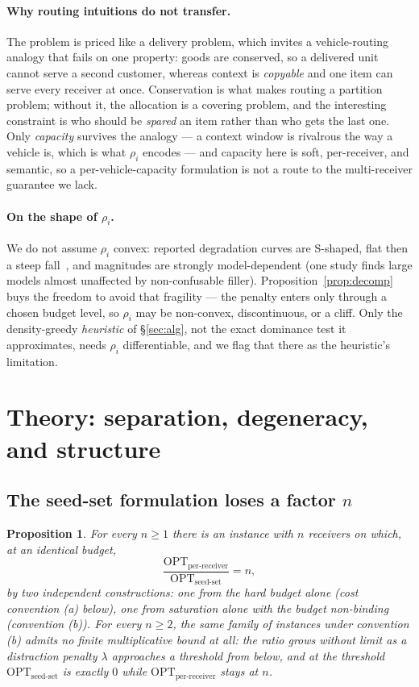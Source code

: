 \documentclass[sigconf,anonymous]{aamas}
\newtheorem{proposition}{Proposition}
\theoremstyle{remark}
\begin{document}
\paragraph{Why routing intuitions do not transfer.} The problem is
priced like a delivery problem, which invites a vehicle-routing
analogy that fails on one property: goods are conserved, so a
delivered unit cannot serve a second customer, whereas context is
\emph{copyable} and one item can serve every receiver at once.
Conservation is what makes routing a partition problem; without it,
the allocation is a covering problem, and the interesting constraint
is who should be \emph{spared} an item rather than who gets the last
one. Only \emph{capacity} survives the analogy --- a context window is
rivalrous the way a vehicle is, which is what $\rho_i$ encodes --- and
capacity here is soft, per-receiver, and semantic, so a
per-vehicle-capacity formulation is not a route to the multi-receiver
guarantee we lack.

\paragraph{On the shape of $\rho_i$.} We do not assume $\rho_i$
convex: reported degradation curves are S-shaped, flat then a steep
fall~\cite{nolima2025,liu2024}, and magnitudes are strongly
model-dependent (one study finds large models almost unaffected by
non-confusable filler). Proposition~\ref{prop:decomp} buys the
freedom to avoid that fragility --- the penalty enters only through a
chosen budget level, so $\rho_i$ may be non-convex, discontinuous, or
a cliff. Only the density-greedy \emph{heuristic} of \S\ref{sec:alg},
not the exact dominance test it approximates, needs $\rho_i$
differentiable, and we flag that there as the heuristic's limitation.

\section{Theory: separation, degeneracy, and structure}
\subsection{The seed-set formulation loses a factor $n$}
\label{sec:sep}

\begin{proposition}
\label{prop:sep}
For every $n \ge 1$ there is an instance with $n$ receivers on which,
at an identical budget,
\[
\frac{\mathrm{OPT}_{\text{per-receiver}}}{\mathrm{OPT}_{\text{seed-set}}} = n ,
\]
by two independent constructions: one from the hard budget alone
(cost convention (a) below), one from saturation alone with the
budget non-binding (convention (b)). For every $n \ge 2$, the same
family of instances under convention (b) admits no finite
multiplicative bound at all: the ratio grows without limit as a
distraction penalty $\lambda$ approaches a threshold from below, and
at the threshold $\mathrm{OPT}_{\text{seed-set}}$ is exactly $0$ while
$\mathrm{OPT}_{\text{per-receiver}}$ stays at $n$.
\end{proposition}
\end{document}
